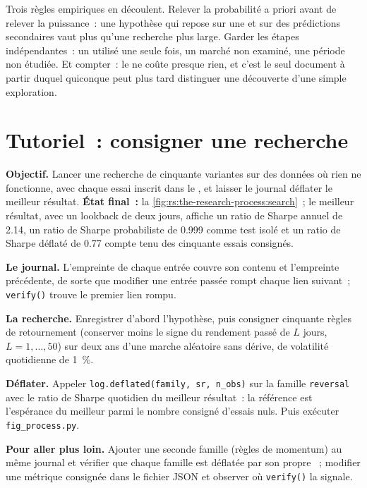Trois règles empiriques en découlent. Relever la probabilité a priori avant de relever la puissance~: une hypothèse qui repose sur une
 et sur des prédictions secondaires vaut plus qu'une recherche plus large. Garder les étapes indépendantes~: un  utilisé une seule fois, un marché non examiné, une période non étudiée.
Et compter~: le  ne coûte presque rien, et c'est le seul document à partir duquel quiconque peut plus tard distinguer une découverte d'une simple exploration.

\section{Tutoriel~: consigner une recherche}\label{tut:rs:the-research-process:log}

\begin{tutorial}
\textbf{Objectif.} Lancer une recherche de cinquante variantes sur des données où rien ne fonctionne, avec chaque essai inscrit dans le , et laisser le journal
déflater le meilleur résultat. \textbf{État final~:} la \cref{fig:rs:the-research-process:search}~; le meilleur résultat, avec un lookback de deux jours, affiche un ratio de Sharpe annuel de
2.14, un ratio de Sharpe probabiliste de 0.999 comme test isolé et un ratio de Sharpe déflaté de 0.77 compte tenu des
cinquante essais consignés.
\begin{tutsteps}
\item \textbf{Le journal.} L'empreinte de chaque entrée couvre son contenu et l'empreinte précédente, de sorte que modifier une entrée passée rompt
chaque lien suivant~; \texttt{verify()} trouve le premier lien rompu.
\label{lst:rs:the-research-process:chain}
\item \textbf{La recherche.} Enregistrer d'abord l'hypothèse, puis consigner cinquante règles de retournement (conserver moins le signe du
rendement passé de $L$ jours, $L = 1, \dots, 50$) sur deux ans d'une marche aléatoire sans dérive, de volatilité quotidienne de 1~\%.
\label{lst:rs:the-research-process:search}
\item \textbf{Déflater.} Appeler \texttt{log.deflated(family, sr, n\_obs)} sur la famille \texttt{reversal} avec le ratio de Sharpe quotidien du meilleur résultat~: la référence est
l'espérance du meilleur parmi le nombre consigné d'essais nuls. Puis exécuter \texttt{fig\_process.py}.
\end{tutsteps}
\textbf{Pour aller plus loin.} Ajouter une seconde famille (règles de momentum) au même journal et vérifier que chaque famille est déflatée par
son propre ~; modifier une métrique consignée dans le fichier JSON et observer où \texttt{verify()} la signale.
\end{tutorial}

